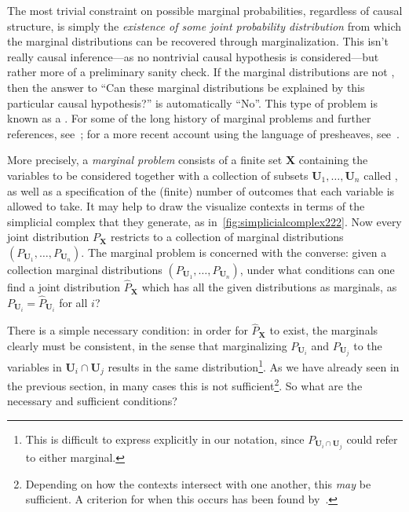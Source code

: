 The most trivial constraint on possible marginal probabilities, regardless of causal structure,  
is simply the \emph{existence of some joint probability distribution} from which the marginal distributions can be recovered through marginalization. This isn't really causal inference---as no nontrivial causal hypothesis is considered---but rather more of a preliminary sanity check. If the marginal distributions are not , then the answer to ``Can these marginal distributions be explained by this particular causal hypothesis?'' is automatically ``No''. This type of problem is known as a . For some of the long history of marginal problems and further references, see~\cite{fritz2013marginal}; for a more recent account using the language of presheaves, see~\cite{abramsky_contextuality_2011}.

More precisely, a \emph{marginal problem} consists of a finite set $\bm{X}$ containing the variables to be considered together with a collection of subsets $\bm{U}_1,\ldots,\bm{U}_n$ called , as well as a specification of the (finite) number of outcomes that each variable is allowed to take. It may help to draw the visualize contexts in terms of the simplicial complex that they generate, as in~\cref{fig:simplicialcomplex222}. Now every joint distribution $P_{\bm{X}}$ restricts to a collection of marginal distributions $(P_{\bm{U}_1},\ldots,P_{\bm{U}_n})$. The marginal problem is concerned with the converse: given a collection marginal distributions $(P_{\bm{U}_1},\ldots,P_{\bm{U}_n})$, under what conditions can one find a joint distribution $\hat{P}_{\bm{X}}$ which has all the given distributions as marginals, as $P_{\bm{U}_i} = \hat{P}_{\bm{U}_i}$ for all $i$?

There is a simple necessary condition: in order for $\hat{P}_{\bm{X}}$ to exist, the marginals clearly must be consistent, in the sense that marginalizing $P_{\bm{U}_i}$ and $P_{\bm{U}_j}$ to the variables in $\bm{U}_i\cap\bm{U}_j$ results in the same distribution\footnote{This is difficult to express explicitly in our notation, since $P_{\bm{U}_i\cap \bm{U}_j}$ could refer to either marginal.}. As we have already seen in the previous section, in many cases this is not sufficient\footnote{Depending on how the contexts intersect with one another, this \emph{may} be sufficient. A criterion for when this occurs has been found by~\citet{vorobev_extension_1960}.}. So what are the necessary and sufficient conditions?


